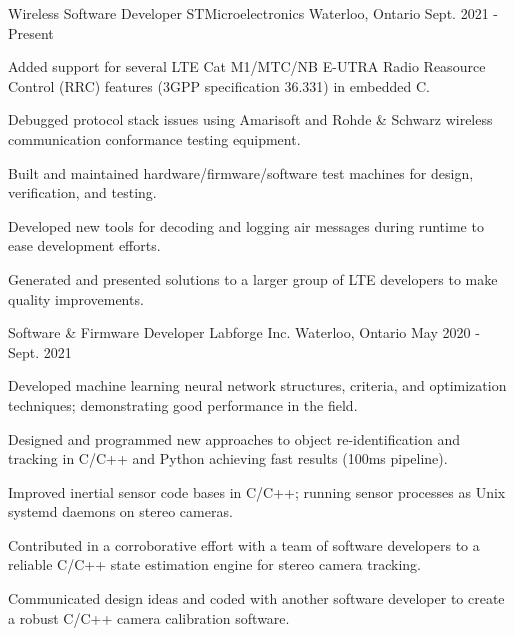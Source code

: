 
\begin{cventries}

  \cventry
    {Wireless Software Developer} %
    {STMicroelectronics} %
    {Waterloo, Ontario} %
    {Sept. 2021 - Present} %
    {
      \begin{cvitems} %
        \item {Added support for several LTE Cat M1/MTC/NB E-UTRA Radio Reasource Control (RRC) features (3GPP specification 36.331) in embedded C.}
        \item {Debugged protocol stack issues using Amarisoft and Rohde \& Schwarz wireless communication conformance testing equipment.}
        \item {Built and maintained hardware/firmware/software test machines for design, verification, and testing.}
        \item {Developed new tools for decoding and logging air messages during runtime to ease development efforts.}
        \item {Generated and presented solutions to a larger group of LTE developers to make quality improvements.}
      \end{cvitems}
    }

  \cventry
    {Software \& Firmware Developer} %
    {Labforge Inc.} %
    {Waterloo, Ontario} %
    {May 2020 - Sept. 2021} %
    {
      \begin{cvitems} %
        \item {Developed machine learning neural network structures, criteria, and optimization techniques; demonstrating good performance in the field.}
        \item {Designed and programmed new approaches to object re-identification and tracking in C/C++ and Python achieving fast results (100ms pipeline).}
        \item {Improved inertial sensor code bases in C/C++; running sensor processes as Unix systemd daemons on stereo cameras.}
        \item {Contributed in a corroborative effort with a team of software developers to a reliable C/C++ state estimation engine for stereo camera tracking.}
        \item {Communicated design ideas and coded with another software developer to create a robust C/C++ camera calibration software.}
      \end{cvitems}
    }


\end{cventries}

